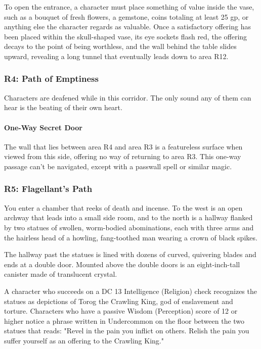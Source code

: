 \documentclass[10pt,a4paper,twoside,bg=print,twocolumn,openany,nodeprecatedcode]{dndbook}
\begin{document}
To open the entrance, a character must place something of value inside the vase, such as a bouquet of fresh flowers, a gemstone, coins totaling at least 25 gp, or anything else the character regards as valuable. Once a satisfactory offering has been placed within the skull-shaped vase, its eye sockets flash red, the offering decays to the point of being worthless, and the wall behind the table slides upward, revealing a long tunnel that eventually leads down to area R12.

\subsubsection{R4: Path of Emptiness}
Characters are deafened while in this corridor. The only sound any of them can hear is the beating of their own heart.

\paragraph{One-Way Secret Door}
The wall that lies between area R4 and area R3 is a featureless surface when viewed from this side, offering no way of returning to area R3. This one-way passage can't be navigated, except with a passwall spell or similar magic.

\subsubsection{R5: Flagellant's Path}
\begin{DndReadAloud}{}
You enter a chamber that reeks of death and incense. To the west is an open archway that leads into a small side room, and to the north is a hallway flanked by two statues of swollen, worm-bodied abominations, each with three arms and the hairless head of a howling, fang-toothed man wearing a crown of black spikes.

The hallway past the statues is lined with dozens of curved, quivering blades and ends at a double door. Mounted above the double doors is an eight-inch-tall canister made of translucent crystal.

\end{DndReadAloud}

A character who succeeds on a DC 13 Intelligence (Religion) check recognizes the statues as depictions of Torog the Crawling King, god of enslavement and torture. Characters who have a passive Wisdom (Perception) score of 12 or higher notice a phrase written in Undercommon on the floor between the two statues that reads: "Revel in the pain you inflict on others. Relish the pain you suffer yourself as an offering to the Crawling King."
\end{document}
